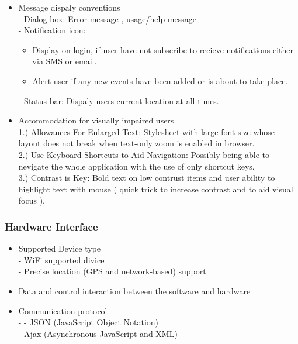 \documentclass[a4paper,12pt]{report}
\begin{document}
\begin{itemize}
			\item Message dispaly conventions \\
				- Dialog box: Error message , usage/help message \\ 
				- Notification icon: 
				\begin{itemize}
				\item Display on login, if user have not subscribe to recieve  notifications either via SMS or email.
				\item Alert user if any new events have been added or is about to take place.
				\end{itemize}
			
				- Status bar: Dispaly users current location at all times. \\
			
			\item Accommodation for visually impaired users.\\
			
				1.) Allowances For Enlarged Text: Stylesheet with large font size whose layout does not break 
				when text-only zoom is enabled in browser. \\
				
				2.) Use Keyboard Shortcuts to Aid Navigation: Possibly being able to nevigate the whole application 
				with the use of only shortcut keys. \\
				
				3.) Contrast is Key: Bold text on low contrust items and user ability to highlight text with mouse 
				( quick trick to increase contrast and to aid visual focus ). \\
		
		\end{itemize}
	\subsubsection{Hardware Interface}
		\begin{itemize}
		\item Supported Device type \\
		- WiFi supported divice \\
		- Precise location (GPS and network-based) support \\
		\item Data and control interaction between the software and hardware \\ 
		
	
		\item Communication protocol \\
		- 
		- JSON (JavaScript Object Notation) \\
		- Ajax (Asynchronous JavaScript and XML) \\
		\end{itemize} 
\end{document}
